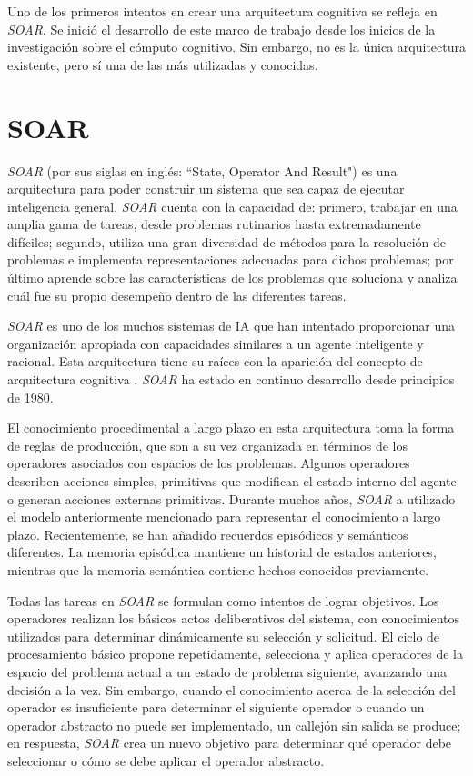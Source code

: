  Uno de los primeros intentos en crear una arquitectura cognitiva se refleja en \emph{SOAR}. Se inici\'{o} el desarrollo de este marco de trabajo desde los inicios de la investigaci\'{o}n sobre el c\'{o}mputo cognitivo. Sin embargo, no es la \'{u}nica arquitectura existente, pero s\'{i} una de las m\'{a}s utilizadas y conocidas.

\section{SOAR}

\emph{SOAR} (por sus siglas en ingl\'{e}s: “State, Operator And Result") es una arquitectura para poder construir un sistema que sea capaz de ejecutar inteligencia general. \emph{SOAR} cuenta con la capacidad de: primero, trabajar en una amplia gama de tareas, desde problemas rutinarios hasta extremadamente dif\'{i}ciles; segundo, utiliza una gran diversidad de m\'{e}todos para la resoluci\'{o}n de problemas e implementa representaciones adecuadas para dichos problemas; por \'{u}ltimo aprende sobre las caracter\'{i}sticas de los problemas que soluciona y analiza cu\'{a}l fue su propio desempe\~no dentro de las diferentes tareas.

 \emph{SOAR} es uno de los muchos sistemas de IA que han intentado proporcionar una organizaci\'{o}n apropiada con capacidades similares a un agente inteligente y racional. Esta arquitectura tiene su raíces con la aparición del concepto de arquitectura cognitiva \cite{newell1973production}.
 \emph{SOAR} ha estado en continuo desarrollo desde principios de 1980. 
 
 El conocimiento procedimental a largo plazo en esta arquitectura toma la forma de reglas de producción, que son a su vez organizada en t\'{e}rminos de los operadores asociados con espacios de los problemas. Algunos operadores describen acciones simples, primitivas que modifican el estado interno del agente o generan acciones externas primitivas. Durante muchos años, \emph{SOAR} a utilizado el modelo anteriormente mencionado para representar el conocimiento a largo plazo. Recientemente, se han añadido recuerdos epis\'{o}dicos y sem\'{a}nticos diferentes. La memoria epis\'{o}dica  mantiene un historial de estados anteriores, mientras que la memoria sem\'{a}ntica contiene hechos conocidos previamente\cite{laird1987soar}.
 
Todas las tareas en \emph{SOAR} se formulan como intentos de lograr objetivos. Los operadores realizan los b\'{a}sicos actos deliberativos del sistema, con conocimientos utilizados para determinar din\'{a}micamente su selección y solicitud. El ciclo de procesamiento b\'{a}sico propone repetidamente, selecciona y aplica operadores de la
espacio del problema actual a un estado de problema siguiente, avanzando una decisi\'{o}n a la vez. Sin embargo, cuando el conocimiento acerca de la selección del operador es insuficiente para determinar el siguiente operador  o cuando un operador abstracto no puede ser implementado, un callejón sin salida se produce; en respuesta, \emph{SOAR} crea un nuevo objetivo para determinar qué operador debe seleccionar o c\'{o}mo se debe aplicar el operador abstracto\cite{langley2009cognitive}.

